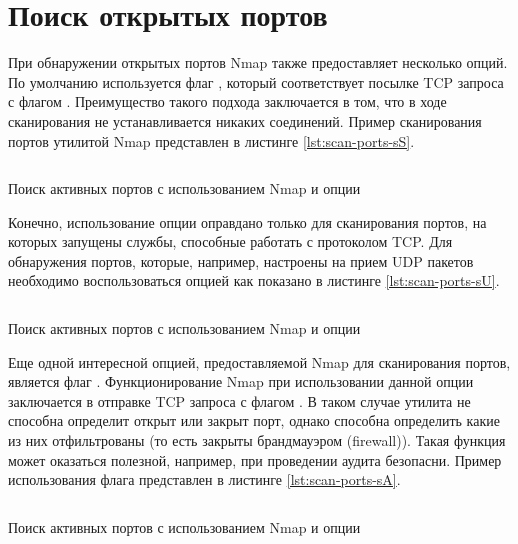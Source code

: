 \section{Поиск открытых портов}

При обнаружении открытых портов Nmap также предоставляет несколько опций. По умолчанию используется флаг , который 
соответствует посылке TCP запроса с флагом . Преимущество такого подхода заключается в том, что в ходе сканирования не 
устанавливается никаких соединений. Пример сканирования портов утилитой Nmap представлен в листинге \ref{lst:scan-ports-sS}. 

\begin{listing}[H]
    \inputminted{console}{resources/03_scan_ports_sS}
    \caption{Поиск активных портов с использованием Nmap и опции }
    \label{lst:scan-ports-sS}
\end{listing}

Конечно, использование опции  оправдано только для сканирования портов, на которых запущены службы, способные работать с 
протоколом TCP. Для обнаружения портов, которые, например, настроены на прием UDP пакетов необходимо воспользоваться опцией 
как показано в листинге \ref{lst:scan-ports-sU}.

\begin{listing}[H]
    \inputminted{console}{resources/04_scan_ports_sU}
    \caption{Поиск активных портов с использованием Nmap и опции }
    \label{lst:scan-ports-sU}
\end{listing}

Еще одной интересной опцией, предоставляемой Nmap для сканирования портов, является флаг . Функционирование Nmap при 
использовании данной опции заключается в отправке TCP запроса с флагом . В таком случае утилита не способна определит открыт
или закрыт порт, однако способна определить какие из них отфильтрованы (то есть закрыты брандмауэром (firewall)). Такая функция может
оказаться полезной, например, при проведении аудита безопасни. Пример использования флага  представлен в листинге 
\ref{lst:scan-ports-sA}.

\begin{listing}[H]
    \inputminted{console}{resources/05_scan_ports_sA}
    \caption{Поиск активных портов с использованием Nmap и опции }
    \label{lst:scan-ports-sA}
\end{listing}